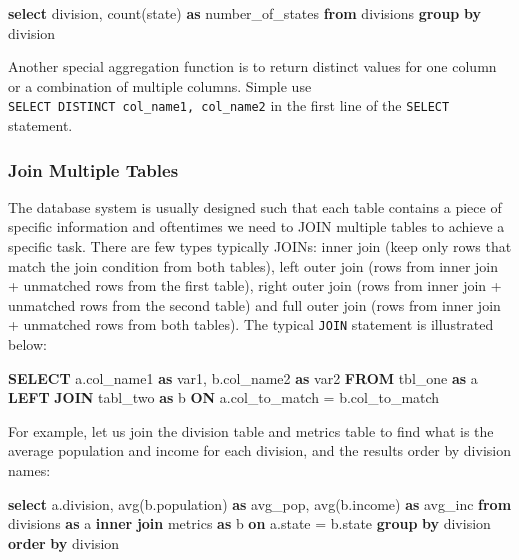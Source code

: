 \documentclass[12pt,]{krantz}
\makeatletter
\newenvironment{Shaded}{\begin{snugshade}}{\end{snugshade}}
\newcommand{\FunctionTok}[1]{\textcolor[rgb]{0,0,0}{#1}}
\newcommand{\KeywordTok}[1]{\textcolor[rgb]{0.27,0.27,0.27}{\textbf{#1}}}
\newcommand{\NormalTok}[1]{#1}
\newenvironment{kframe}{%
\medskip{}
\setlength{\fboxsep}{.8em}
 \def\at@end@of@kframe{}%
 \ifinner\ifhmode%
  \def\at@end@of@kframe{\end{minipage}}%
  \begin{minipage}{\columnwidth}%
 \fi\fi%
 \def\FrameCommand##1{\hskip\@totalleftmargin \hskip-\fboxsep
 \colorbox{shadecolor}{##1}\hskip-\fboxsep
     \hskip-\linewidth \hskip-\@totalleftmargin \hskip\columnwidth}%
 \MakeFramed {\advance\hsize-\width
   \@totalleftmargin\z@ \linewidth\hsize
   \@setminipage}}%
 {\par\unskip\endMakeFramed%
 \at@end@of@kframe}
\renewenvironment{Shaded}{\begin{kframe}}{\end{kframe}}
\makeatother
\begin{document}
\begin{Shaded}
\begin{Highlighting}[]
\KeywordTok{select}\NormalTok{ division, }\FunctionTok{count}\NormalTok{(state) }\KeywordTok{as}\NormalTok{ number_of_states}
\KeywordTok{from}\NormalTok{ divisions}
\KeywordTok{group} \KeywordTok{by}\NormalTok{ division}
\end{Highlighting}
\end{Shaded}

Another special aggregation function is to return distinct values for one column or a combination of multiple columns. Simple use \texttt{SELECT\ DISTINCT\ col\_name1,\ col\_name2} in the first line of the \texttt{SELECT} statement.

\hypertarget{join-multiple-tables}{%
\subsubsection{Join Multiple Tables}\label{join-multiple-tables}}

The database system is usually designed such that each table contains a piece of specific information and oftentimes we need to JOIN multiple tables to achieve a specific task. There are few types typically JOINs: inner join (keep only rows that match the join condition from both tables), left outer join (rows from inner join + unmatched rows from the first table), right outer join (rows from inner join + unmatched rows from the second table) and full outer join (rows from inner join + unmatched rows from both tables). The typical \texttt{JOIN} statement is illustrated below:

\begin{Shaded}
\begin{Highlighting}[]
\KeywordTok{SELECT}\NormalTok{ a.col_name1 }\KeywordTok{as}\NormalTok{ var1, b.col_name2 }\KeywordTok{as}\NormalTok{ var2}
\KeywordTok{FROM}\NormalTok{ tbl_one }\KeywordTok{as}\NormalTok{ a}
\KeywordTok{LEFT} \KeywordTok{JOIN}\NormalTok{ tabl_two }\KeywordTok{as}\NormalTok{ b}
\KeywordTok{ON}\NormalTok{ a.col_to_match = b.col_to_match}
\end{Highlighting}
\end{Shaded}

For example, let us join the division table and metrics table to find what is the average population and income for each division, and the results order by division names:

\begin{Shaded}
\begin{Highlighting}[]
\KeywordTok{select}\NormalTok{ a.division, }\FunctionTok{avg}\NormalTok{(b.population) }\KeywordTok{as}\NormalTok{ avg_pop,}
\FunctionTok{avg}\NormalTok{(b.income) }\KeywordTok{as}\NormalTok{ avg_inc}
\KeywordTok{from}\NormalTok{ divisions }\KeywordTok{as}\NormalTok{ a}
\KeywordTok{inner} \KeywordTok{join}\NormalTok{ metrics }\KeywordTok{as}\NormalTok{ b}
\KeywordTok{on}\NormalTok{ a.state = b.state}
\KeywordTok{group} \KeywordTok{by}\NormalTok{ division}
\KeywordTok{order} \KeywordTok{by}\NormalTok{ division}
\end{Highlighting}
\end{Shaded}
\end{document}
